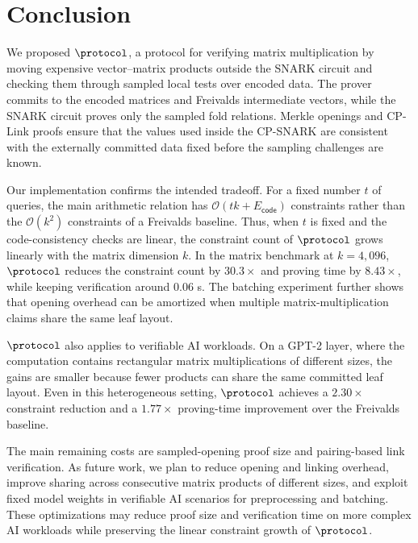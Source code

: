 \section{Conclusion}
\label{sec:conclusion}

We proposed \(\protocol\), a protocol for verifying matrix multiplication by
moving expensive vector--matrix products outside the SNARK circuit and checking
them through sampled local tests over encoded data.  The prover commits to the
encoded matrices and Freivalds intermediate vectors, while the SNARK circuit
proves only the sampled fold relations.  Merkle openings and CP-Link proofs
ensure that the values used inside the CP-SNARK are consistent with the
externally committed data fixed before the sampling challenges are known.

Our implementation confirms the intended tradeoff.  For a fixed number \(t\) of
queries, the main arithmetic relation has
\(\mathcal{O}(tk+E_{\mathsf{code}})\) constraints rather than the
\(\mathcal{O}(k^2)\) constraints of a Freivalds baseline.  Thus, when \(t\) is
fixed and the code-consistency checks are linear, the constraint count of
\(\protocol\) grows linearly with the matrix dimension \(k\).  In the matrix
benchmark at \(k=4{,}096\), \(\protocol\) reduces the constraint count by
\(30.3\times\) and proving time by \(8.43\times\), while keeping verification
around \(0.06\) s.  The batching experiment further shows that opening overhead
can be amortized when multiple matrix-multiplication claims share the same leaf
layout.

\(\protocol\) also applies to verifiable AI workloads.  On a GPT-2 layer, where
the computation contains rectangular matrix multiplications of different sizes,
the gains are smaller because fewer products can share the same committed leaf
layout.  Even in this heterogeneous setting, \(\protocol\) achieves a
\(2.30\times\) constraint reduction and a \(1.77\times\) proving-time
improvement over the Freivalds baseline.

The main remaining costs are sampled-opening proof size and pairing-based link
verification.  As future work, we plan to reduce opening and linking overhead,
improve sharing across consecutive matrix products of different sizes, and
exploit fixed model weights in verifiable AI scenarios for preprocessing and
batching.  These optimizations may reduce proof size and verification time on
more complex AI workloads while preserving the linear constraint growth of
\(\protocol\).


\newpage
